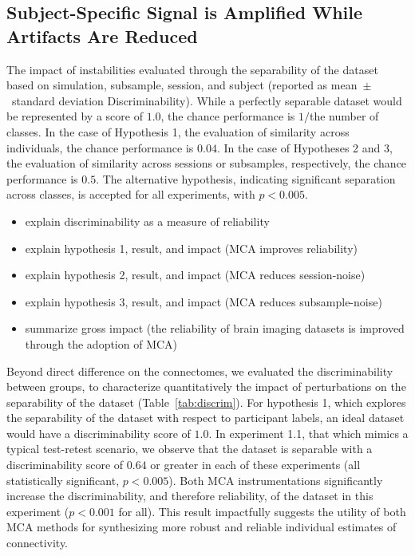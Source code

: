 \documentclass[fleqn,10pt]{SelfArx} %
\begin{document}
\subsection*{Subject-Specific Signal is Amplified While Artifacts Are Reduced}
\begin{table}[ht]\centering
\caption{The impact of instabilities evaluated through the separability of the dataset based on simulation, subsample,
session, and subject (reported as mean~$\pm$~standard deviation Discriminability). While a perfectly separable dataset
would be represented by a score of $1.0$, the chance performance is $1 /$the number of classes. In the case of
Hypothesis 1, the evaluation of similarity across individuals, the chance performance is $0.04$. In the case of
Hypotheses 2 and 3, the evaluation of similarity across sessions or subsamples, respectively, the chance performance is
$0.5$. The alternative hypothesis, indicating significant separation across classes, is accepted for all experiments,
with $p < 0.005$.}
\vspace{5pt}

\label{tab:discrim}
\end{table}

\begin{itemize}
\item explain discriminability as a measure of reliability
\item explain hypothesis 1, result, and impact (MCA improves reliability)
\item explain hypothesis 2, result, and impact (MCA reduces session-noise)
\item explain hypothesis 3, result, and impact (MCA reduces subsample-noise)
\item summarize gross impact (the reliability of brain imaging datasets is improved through the adoption of MCA)
\end{itemize}

Beyond direct difference on the connectomes, we evaluated the discriminability between groups, to characterize
quantitatively the impact of perturbations on the separability of the dataset (Table~\ref{tab:discrim}). For
hypothesis 1, which explores the separability of the dataset with respect to participant labels, an ideal dataset would
have a discriminability score of $1.0$. In experiment 1.1, that which mimics a typical test-retest scenario, we observe
that the dataset is separable with a discriminability score of $0.64$ or greater in each of these experiments (all
statistically significant, $p < 0.005$). Both MCA instrumentations significantly increase the discriminability, and
therefore reliability, of the dataset in this experiment ($p < 0.001$ for all). This result impactfully suggests the
utility of both MCA methods for synthesizing more robust and reliable individual estimates of connectivity.
\end{document}
